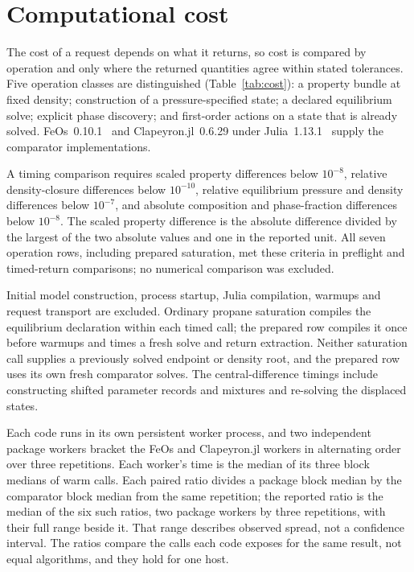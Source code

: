 \section{Computational cost}
\label{sec:performance}
The cost of a request depends on what it returns, so cost is compared by operation and only where the returned quantities agree within stated tolerances.
Five operation classes are distinguished (Table~\ref{tab:cost}): a property bundle at fixed density; construction of a pressure-specified state; a declared equilibrium solve; explicit phase discovery; and first-order actions on a state that is already solved.
FeOs~0.10.1~\citep{rehnerFeOsOpenSourceFramework2023} and Clapeyron.jl~0.6.29 under Julia~1.13.1~\citep{walkerClapeyronjlExtensibleOpenSource2022} supply the comparator implementations.

A timing comparison requires scaled property differences below $10^{-8}$, relative density-closure differences below $10^{-10}$, relative equilibrium pressure and density differences below $10^{-7}$, and absolute composition and phase-fraction differences below $10^{-8}$.
The scaled property difference is the absolute difference divided by the largest of the two absolute values and one in the reported unit.
All seven operation rows, including prepared saturation, met these criteria in preflight and timed-return comparisons; no numerical comparison was excluded.

Initial model construction, process startup, Julia compilation, warmups and request transport are excluded.
Ordinary propane saturation compiles the equilibrium declaration within each timed call; the prepared row compiles it once before warmups and times a fresh solve and return extraction.
Neither saturation call supplies a previously solved endpoint or density root, and the prepared row uses its own fresh comparator solves.
The central-difference timings include constructing shifted parameter records and mixtures and re-solving the displaced states.

Each code runs in its own persistent worker process, and two independent package workers bracket the FeOs and Clapeyron.jl workers in alternating order over three repetitions.
Each worker's time is the median of its three block medians of warm calls.
Each paired ratio divides a package block median by the comparator block median from the same repetition; the reported ratio is the median of the six such ratios, two package workers by three repetitions, with their full range beside it.
That range describes observed spread, not a confidence interval.
The ratios compare the calls each code exposes for the same result, not equal algorithms, and they hold for one host.

